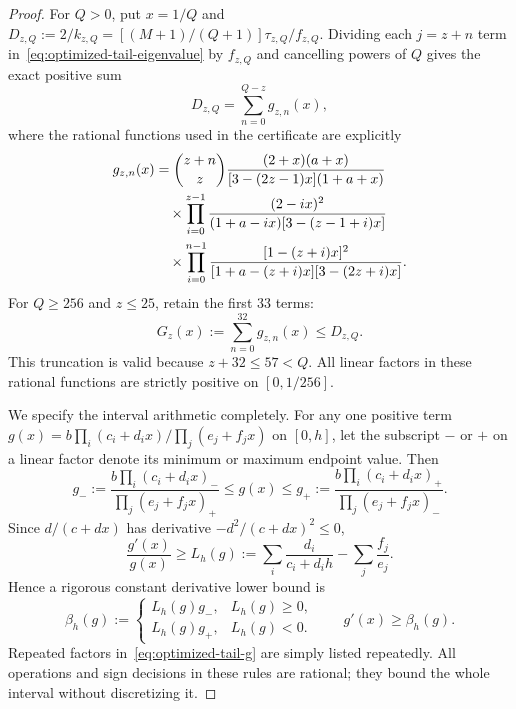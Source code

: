 \begin{proof}
For $Q>0$, put $x=1/Q$ and
$D_{z,Q}:=2/k_{z,Q}=[(M+1)/(Q+1)]\tau_{z,Q}/f_{z,Q}$.
Dividing each $j=z+n$ term in~\eqref{eq:optimized-tail-eigenvalue} by
$f_{z,Q}$ and cancelling powers of $Q$ gives the exact positive sum
\begin{equation}\label{eq:optimized-tail-D}
 D_{z,Q}=\sum_{n=0}^{Q-z}g_{z,n}(x),
\end{equation}
where the rational functions used in the certificate are explicitly
\begin{align}
 g_{z,n}(x)&=\binom{z+n}{z}
 \frac{(2+x)(a+x)}{[3-(2z-1)x](1+a+x)}\notag\\
 &\quad\times\prod_{i=0}^{z-1}
 \frac{(2-ix)^2}{(1+a-ix)[3-(z-1+i)x]}\notag\\
 &\quad\times\prod_{i=0}^{n-1}
 \frac{[1-(z+i)x]^2}{[1+a-(z+i)x][3-(2z+i)x]}.
 \label{eq:optimized-tail-g}
\end{align}
For $Q\ge256$ and $z\le25$, retain the first $33$ terms:
\begin{equation}
 G_z(x):=\sum_{n=0}^{32}g_{z,n}(x)\le D_{z,Q}.
\end{equation}
This truncation is valid because $z+32\le57<Q$. All linear factors in
these rational functions are strictly positive on $[0,1/256]$.

We specify the interval arithmetic completely. For any one positive term
$g(x)=b\prod_i(c_i+d_ix)/\prod_j(e_j+f_jx)$ on $[0,h]$, let the subscript
$-$ or $+$ on a linear factor denote its minimum or maximum endpoint value.
Then
\begin{equation}
 g_-:=\frac{b\prod_i(c_i+d_ix)_-}{\prod_j(e_j+f_jx)_+}
 \le g(x)\le
 g_+:=\frac{b\prod_i(c_i+d_ix)_+}{\prod_j(e_j+f_jx)_-}.
\end{equation}
Since $d/(c+dx)$ has derivative $-d^2/(c+dx)^2\le0$,
\begin{equation}
 \frac{g'(x)}{g(x)}\ge
 L_h(g):=\sum_i\frac{d_i}{c_i+d_ih}-\sum_j\frac{f_j}{e_j}.
\end{equation}
Hence a rigorous constant derivative lower bound is
\begin{equation}\label{eq:optimized-tail-interval-rule}
 \beta_h(g):=
 \begin{cases}L_h(g)g_-,&L_h(g)\ge0,\\
               L_h(g)g_+,&L_h(g)<0.
 \end{cases}
 \qquad g'(x)\ge\beta_h(g).
\end{equation}
Repeated factors in~\eqref{eq:optimized-tail-g} are simply listed repeatedly.
All operations and sign decisions in these rules are rational; they bound
the whole interval without discretizing it.


\end{proof}
